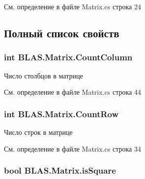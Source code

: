 См. определение в файле Matrix.\+cs строка 24



\subsection{Полный список свойств}
\subsubsection[{\texorpdfstring{Count\+Column}{CountColumn}}]{\setlength{\rightskip}{0pt plus 5cm}int B\+L\+A\+S.\+Matrix.\+Count\+Column\hspace{0.3cm}{\ttfamily [get]}}\hypertarget{class_b_l_a_s_1_1_matrix_aae67f388c0c049518adc10781e29d091}{}\label{class_b_l_a_s_1_1_matrix_aae67f388c0c049518adc10781e29d091}


Число столбцов в матрице 



См. определение в файле Matrix.\+cs строка 44

\subsubsection[{\texorpdfstring{Count\+Row}{CountRow}}]{\setlength{\rightskip}{0pt plus 5cm}int B\+L\+A\+S.\+Matrix.\+Count\+Row\hspace{0.3cm}{\ttfamily [get]}}\hypertarget{class_b_l_a_s_1_1_matrix_a511a107843f7d488a87a7f01a184e893}{}\label{class_b_l_a_s_1_1_matrix_a511a107843f7d488a87a7f01a184e893}


Число строк в матрице 



См. определение в файле Matrix.\+cs строка 34

\subsubsection[{\texorpdfstring{is\+Square}{isSquare}}]{\setlength{\rightskip}{0pt plus 5cm}bool B\+L\+A\+S.\+Matrix.\+is\+Square\hspace{0.3cm}{\ttfamily [get]}}\hypertarget{class_b_l_a_s_1_1_matrix_aba7efc43be0d4d739b278d3c82d21935}{}\label{class_b_l_a_s_1_1_matrix_aba7efc43be0d4d739b278d3c82d21935}


